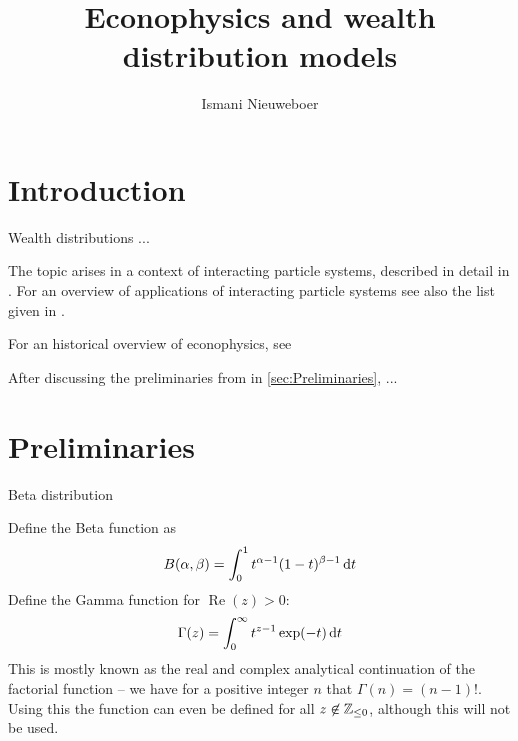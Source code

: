 \documentclass{article}
\title{Econophysics and wealth distribution models}
\author{Ismani Nieuweboer}
\begin{document}
\maketitle











\section*{Introduction}
Wealth distributions ...

The topic arises in a context of interacting particle systems, described in detail in  \cite{liggett2012interacting, liggett2013stochastic}. For an overview of applications of interacting particle systems see also the list given in \cite{frankredig2014}.

For an historical overview of econophysics, see \cite{2008arXiv0802.1416D, 2011arXiv1108.0977S}

After discussing the preliminaries from \cite{frankredig2014} in \autoref{sec:Preliminaries}, ...


\section{Preliminaries}%
Beta distribution

Define the Beta function as
\[
B(\alpha, \beta)
= \int_{0}^{1} t^{\alpha-1} (1-t)^{\beta-1} \mathop{}\!\mathrm{d} t
\]
Define the Gamma function for $\operatorname*{Re}(z) > 0$:
\[
\Gamma(z)
= \int_{0}^{\infty} t^{z-1} \exp(-t) \mathop{}\!\mathrm{d} t
\]
This is mostly known as the real and complex analytical continuation of the factorial function -- we have for a positive integer $n$ that $\Gamma(n) = (n-1)!$. Using this the function can even be defined for all $z \not \in \mathbb{Z}_{\le 0}$, although this will not be used.
\end{document}
